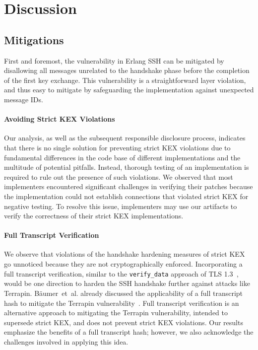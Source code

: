 \section{Discussion}

\subsection{Mitigations}
\label{sub:mitigations}

First and foremost, the vulnerability in Erlang SSH can be mitigated by disallowing all messages unrelated to the handshake phase before the completion of the first key exchange. This vulnerability is a straightforward layer violation, and thus easy to mitigate by safeguarding the implementation against unexpected message IDs.

\paragraph{Avoiding Strict KEX Violations}

Our analysis, as well as the subsequent responsible disclosure process, indicates that there is no single solution for preventing strict KEX violations due to fundamental differences in the code base of different implementations and the multitude of potential pitfalls. Instead, thorough testing of an implementation is required to rule out the presence of such violations. We observed that most implementers encountered significant challenges in verifying their patches because the implementation could not establish connections that violated strict KEX for negative testing. To resolve this issue, implementers may use our artifacts to verify the correctness of their strict KEX implementations.

\paragraph{Full Transcript Verification}

We observe that violations of the handshake hardening measures of strict KEX go unnoticed because they are not cryptographically enforced. Incorporating a full transcript verification, similar to the \texttt{verify\_data} approach of TLS 1.3~\cite{rfc8446}, would be one direction to harden the SSH handshake further against attacks like Terrapin. Bäumer~et~al. already discussed the applicability of a full transcript hash to mitigate the Terrapin vulnerability~\cite{USENIX:BauBriSch24}. Full transcript verification is an alternative approach to mitigating the Terrapin vulnerability, intended to supersede strict KEX, and does not prevent strict KEX violations. Our results emphasize the benefits of a full transcript hash; however, we also acknowledge the challenges involved in applying this idea.


